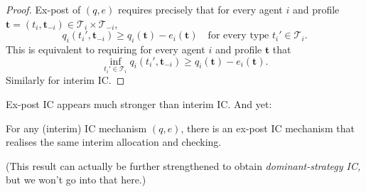 \begin{proof}
	Ex-post of $(q,e)$ requires precisely that
	for every agent $i$
	and profile $\boldsymbol{t} = (t_i,\boldsymbol{t}_{-i}) \in \mathcal{T}_i \times \mathcal{T}_{-i}$,
	\begin{equation*}
		q_i(t_i',\boldsymbol{t}_{-i}) 
		\geq q_i(\boldsymbol{t}) - e_i(\boldsymbol{t}) 
		\quad \text{for every type $t_i' \in \mathcal{T}_i$.}
	\end{equation*}
	This is equivalent to requiring
	for every agent $i$
	and profile $\boldsymbol{t}$
	that
	\begin{equation*}
		\inf_{t_i' \in \mathcal{T}_i} q_i(t_i',\boldsymbol{t}_{-i}) 
		\geq q_i(\boldsymbol{t}) - e_i(\boldsymbol{t}) .
	\end{equation*}
	Similarly for interim IC.
\end{proof}

Ex-post IC appears much stronger than interim IC. And yet:

\begin{theorem}
	\label{theorem:bdl_epic}
	For any (interim) IC mechanism $(q,e)$,
	there is an ex-post IC mechanism that realises the same interim allocation and checking.
\end{theorem}

(This result can actually be further strengthened to obtain \emph{dominant-strategy IC,} but we won't go into that here.)

